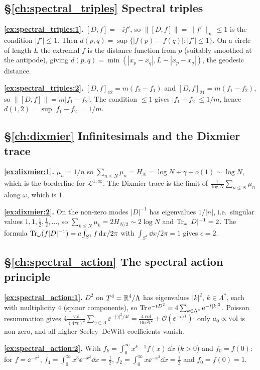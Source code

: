 {\subsection*{\S\ref{ch:spectral_triples} Spectral triples}
\textbf{\ref{ex:spectral_triples:1}.} $[D,f]=-\ii f'$, so $\|[D,f]\|=\|f'\|_\infty\le1$ is the condition $|f'|\le1$. Then $d(p,q)=\sup\{|f(p)-f(q)|:|f'|\le1\}$. On a circle of length $L$ the extremal $f$ is the distance function from $p$ (suitably smoothed at the antipode), giving $d(p,q)=\min(|x_p-x_q|,L-|x_p-x_q|)$, the geodesic distance.\par
\textbf{\ref{ex:spectral_triples:2}.} $[D,f]_{12}=m(f_2-f_1)$ and $[D,f]_{21}=m(f_1-f_2)$, so $\|[D,f]\|=m|f_1-f_2|$. The condition $\le1$ gives $|f_1-f_2|\le1/m$, hence $d(1,2)=\sup|f_1-f_2|=1/m$.\par

\subsection*{\S\ref{ch:dixmier} Infinitesimals and the Dixmier trace}
\textbf{\ref{ex:dixmier:1}.} $\mu_n=1/n$ so $\sum_{n\le N}\mu_n=H_N=\log N+\gamma+o(1)\sim\log N$, which is the borderline for $\mathcal L^{1,\infty}$. The Dixmier trace is the limit of $\frac1{\log N}\sum_{n\le N}\mu_n$ along $\omega$, which is $1$.\par
\textbf{\ref{ex:dixmier:2}.} On the non-zero modes $|D|^{-1}$ has eigenvalues $1/|n|$, i.e.\ singular values $1,1,\frac12,\frac12,\dots$, so $\sum_{k\le N}\mu_k=2H_{N/2}\sim2\log N$ and $\operatorname{Tr}_\omega|D|^{-1}=2$. The formula $\operatorname{Tr}_\omega(f|D|^{-1})=c\int_{S^1}f\,\mathrm{d} x/2\pi$ with $\int_{S^1}\dd x/2\pi=1$ gives $c=2$.\par

\subsection*{\S\ref{ch:spectral_action} The spectral action principle}
\textbf{\ref{ex:spectral_action:1}.} $D^2$ on $T^4=\mathbb{R}^4/\Lambda$ has eigenvalues $|k|^2$, $k\in\Lambda^*$, each with multiplicity $4$ (spinor components), so $\operatorname{Tr}\mathrm{e}^{-tD^2}=4\sum_{k\in\Lambda^*}\mathrm{e}^{-t|k|^2}$. Poisson resummation gives $4\frac{\mathrm{vol}}{(4\pi t)^2}\sum_{\gamma\in\Lambda}\ee^{-|\gamma|^2/4t}=\frac{4\,\mathrm{vol}}{16\pi^2t^2}+\mathcal O(\ee^{-c/t})$: only $a_0\propto\mathrm{vol}$ is non-zero, and all higher Seeley--DeWitt coefficients vanish.\par
\textbf{\ref{ex:spectral_action:2}.} With $f_k=\int_0^\infty x^{k-1}f(x)\,\dd x$ ($k>0$) and $f_0=f(0)$: for $f=\ee^{-x^2}$, $f_4=\int_0^\infty x^3\ee^{-x^2}\dd x=\frac12$, $f_2=\int_0^\infty x\ee^{-x^2}\dd x=\frac12$ and $f_0=f(0)=1$.\par

}
